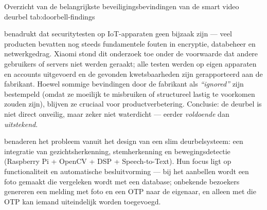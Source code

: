 \documentclass[nonacm, sigconf]{acmart}
\begin{document}
    \begin{SimpleTable}[ll]{Overzicht van de belangrijkste beveiligingsbevindingen van de smart video deurbel} {tab:doorbell-findings}
    \end{SimpleTable}


    \noindent
    \citeauthor{liu2021ethical} benadrukt dat securitytesten op IoT-apparaten geen bijzaak zijn — veel producten bevatten nog steeds fundamentele fouten in encryptie, databeheer en netwerkgedrag. Xiaomi stond dit onderzoek toe onder de voorwaarde dat andere gebruikers of servers niet werden geraakt; alle testen werden op eigen apparaten en accounts uitgevoerd en de gevonden kwetsbaarheden zijn gerapporteerd aan de fabrikant. Hoewel sommige bevindingen door de fabrikant als \textit{``ignored''} zijn bestempeld (omdat ze moeilijk te misbruiken of structureel lastig te voorkomen zouden zijn), blijven ze cruciaal voor productverbetering. Conclusie: de deurbel is niet direct onveilig, maar zeker niet waterdicht — eerder \emph{voldoende} dan \emph{uitstekend}.

    \bigskip


    \parencite{chaudhari2020smart} benaderen het probleem vanuit het design van een slim deurbelsysteem: een integratie van gezichtsherkenning, stemherkenning en bewegingsdetectie (Raspberry Pi + OpenCV + DSP + Speech-to-Text). Hun focus ligt op functionaliteit en automatische besluitvorming — bij het aanbellen wordt een foto gemaakt die vergeleken wordt met een database; onbekende bezoekers genereren een melding met foto en een OTP naar de eigenaar, en alleen met die OTP kan iemand uiteindelijk worden toegevoegd.
\end{document}
